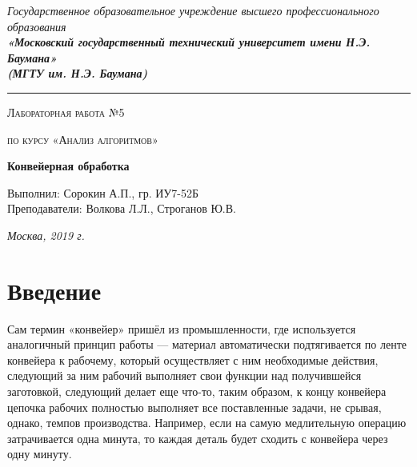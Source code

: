 \documentclass[12pt, a4paper]{report}
\begin{document}
    \begin{titlepage}
    	
    	\begin{center}
    		\Large
    		{\sl Государственное образовательное учреждение высшего профессионального образования\\
    			{\bf«Московский государственный технический университет имени Н.Э. Баумана»\\
    				(МГТУ им. Н.Э. Баумана)}}
    		\noindent\rule{\textwidth}{2pt}
    		\vspace{3cm}
    		
    		{\scshape\LARGE Лабораторная работа №5 \par}
    		\vspace{0.5cm}	
    		{\scshape\LARGE по курсу «Анализ алгоритмов» \par}
    		\vspace{1.5cm}
    		{\huge\bfseries Конвейерная обработка \par}
    		\vspace{2cm}
    		\Large Выполнил: Сорокин А.П., гр. ИУ7-52Б\\
    		\vspace{0.5cm}
    		{\Large Преподаватели: Волкова Л.Л., Строганов Ю.В.}
    		
    		\vfill
    		\Large \textit {Москва, 2019 г.}
    		
    	\end{center}
    	
    \end{titlepage}
	
	\tableofcontents

	\chapter*{Введение}
	\hspace{0.5cm}Сам термин «конвейер» пришёл из промышленности, где используется аналогичный принцип работы — материал автоматически подтягивается по ленте конвейера к рабочему, который осуществляет с ним необходимые действия, следующий за ним рабочий выполняет свои функции над получившейся заготовкой, следующий делает еще что-то, таким образом, к концу конвейера цепочка рабочих полностью выполняет все поставленные задачи, не срывая, однако, темпов производства. Например, если на самую медлительную операцию затрачивается одна минута, то каждая деталь будет сходить с конвейера через одну минуту.
	
\end{document}
